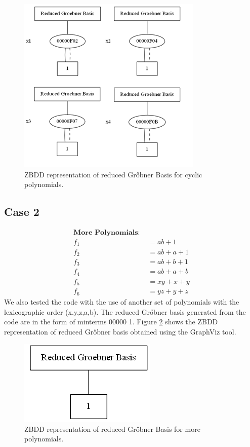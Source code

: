 \documentclass[letterpaper, 10 pt, conference]{ieeeconf}
\begin{document}
\begin{figure}[b]\centering
\includegraphics[scale=.90]{case1}
\caption{ZBDD representation of reduced Gr{\H o}bner Basis for cyclic polynomials.}
\label{fig:case1}
\end{figure}

\subsection{Case 2}
\label{sec:case2}
\begin{align*}
\textbf{More Polynomials: } \\
f_{1} &= ab+1 \\
f_{2} &= ab+a+1 \\
f_{3} &= ab+b+1 \\
f_{4} &= ab+a+b \\
f_{5} &= xy+x+y \\
f_{6} &= yz+y+z
\end{align*}
We also tested the code with the use of another set of polynomials with the lexicographic order (x,y,z,a,b). The reduced Gr{\H o}bner basis generated from the code are in the form of minterms 00000 1. Figure \ref{fig:case2} shows the ZBDD representation of reduced Gr{\H o}bner basis obtained using the GraphViz tool.

\begin{figure}[t]\centering
\includegraphics[scale=.75]{case2}
\caption{ZBDD representation of reduced Gr{\H o}bner Basis for more polynomials.}
\label{fig:case2}
\end{figure}
\end{document}
